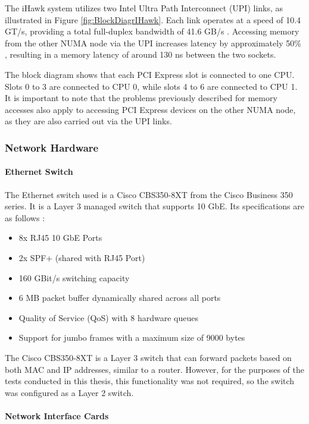 The iHawk system utilizes two Intel Ultra Path Interconnect (UPI) links, as illustrated in Figure \ref{fig:BlockDiagrIHawk}.  Each link operates at a speed of 10.4 GT/s, providing a total full-duplex bandwidth of 41.6 GB/s \cite{setup08}. Accessing memory from the other NUMA node via the UPI increases latency by approximately 50\% \cite{setup06}, resulting in a memory latency of around 130 ns \cite{setup07} between the two sockets.

The block diagram shows that each PCI Express slot is connected to one CPU. Slots 0 to 3 are connected to CPU 0, while slots 4 to 6 are connected to CPU 1. It is important to note that the problems previously described for memory accesses also apply to accessing PCI Express devices on the other NUMA node, as they are also carried out via the UPI links.


\subsubsection{Network Hardware}

\paragraph{Ethernet Switch} \label{chap:EthernetSwitch}
The Ethernet switch used is a Cisco CBS350-8XT from the Cisco Business 350 series. It is a Layer 3 managed switch that supports 10 GbE. Its specifications are as follows \cite{setup09}:

\begin{itemize}
\item 8x RJ45 10 GbE Ports
\item 2x SPF+ (shared with RJ45 Port)
\item 160 GBit/s switching capacity
\item 6 MB packet buffer dynamically shared across all ports
\item Quality of Service (QoS) with 8 hardware queues
\item Support for jumbo frames with a maximum size of 9000 bytes
\end{itemize}

The Cisco CBS350-8XT is a Layer 3 switch that can forward packets based on both MAC and IP addresses, similar to a router.  However, for the purposes of the tests conducted in this thesis, this functionality was not required, so the switch was configured as a Layer 2 switch.

\paragraph{Network Interface Cards}

